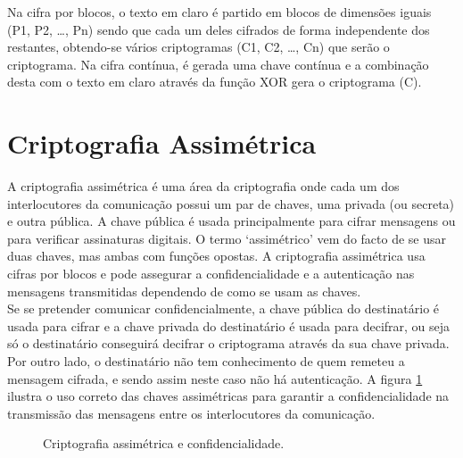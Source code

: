 \documentclass[a4paper,11pt,openright,oneside]{report}
\begin{document}
Na cifra por blocos, o texto em claro é partido em blocos de dimensões iguais (P1, P2, …, Pn) sendo que cada um deles cifrados de forma independente dos restantes, obtendo-se vários criptogramas (C1, C2, …, Cn) que serão o criptograma. Na cifra contínua, é gerada uma chave contínua e a combinação desta com o texto em claro através da função XOR gera o criptograma (C).

\section{Criptografia Assimétrica}
\label{chap.assimétrica}

A criptografia assimétrica é uma área da criptografia onde cada um dos interlocutores da comunicação possui um par de chaves, uma privada (ou secreta) e outra pública. A chave pública é usada principalmente para cifrar mensagens ou para verificar assinaturas digitais. O termo ‘assimétrico’ vem do facto de se usar duas chaves, mas ambas com funções opostas. A criptografia assimétrica usa cifras por blocos e pode assegurar a confidencialidade e a autenticação nas mensagens transmitidas dependendo de como se usam as chaves.\\

Se se pretender comunicar confidencialmente, a chave pública do destinatário é usada para cifrar e a chave privada do destinatário é usada para decifrar, ou seja só o destinatário conseguirá decifrar o criptograma através da sua chave privada. Por outro lado, o destinatário não tem conhecimento de quem remeteu a mensagem cifrada, e sendo assim neste caso não há autenticação. A figura \ref{fig:crypto3} ilustra o uso correto das chaves assimétricas para garantir a confidencialidade na transmissão das mensagens entre os interlocutores da comunicação.

\begin{figure}[ht]
\center
{}
\caption{Criptografia assimétrica e confidencialidade.}
\label{fig:crypto3}
\end{figure}
\end{document}
